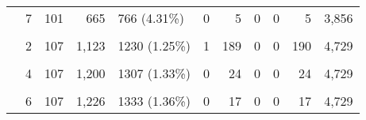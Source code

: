 \documentclass[]{bmcart}
\begin{document}
\begin{backmatter}
\begin{table}[H]
{\begin{tabular}[t]{llrrlrrrrrr}
 & 7 & 101 & 665 & 766 (4.31\%) & 0 & 5 & 0 & 0 & 5 & 3,856\\
\cellcolor{gray!6}{Session2 (n = 98371)} & \cellcolor{gray!6}{1} & \cellcolor{gray!6}{106} & \cellcolor{gray!6}{934} & \cellcolor{gray!6}{1040 (1.06\%)} & \cellcolor{gray!6}{5} & \cellcolor{gray!6}{270} & \cellcolor{gray!6}{998} & \cellcolor{gray!6}{0} & \cellcolor{gray!6}{1,273} & \cellcolor{gray!6}{4,729}\\
 & 2 & 107 & 1,123 & 1230 (1.25\%) & 1 & 189 & 0 & 0 & 190 & 4,729\\
\addlinespace
\cellcolor{gray!6}{} & \cellcolor{gray!6}{3} & \cellcolor{gray!6}{107} & \cellcolor{gray!6}{1,176} & \cellcolor{gray!6}{1283 (1.3\%)} & \cellcolor{gray!6}{0} & \cellcolor{gray!6}{53} & \cellcolor{gray!6}{0} & \cellcolor{gray!6}{0} & \cellcolor{gray!6}{53} & \cellcolor{gray!6}{4,733}\\
 & 4 & 107 & 1,200 & 1307 (1.33\%) & 0 & 24 & 0 & 0 & 24 & 4,729\\
\cellcolor{gray!6}{} & \cellcolor{gray!6}{5} & \cellcolor{gray!6}{107} & \cellcolor{gray!6}{1,209} & \cellcolor{gray!6}{1316 (1.34\%)} & \cellcolor{gray!6}{0} & \cellcolor{gray!6}{9} & \cellcolor{gray!6}{0} & \cellcolor{gray!6}{0} & \cellcolor{gray!6}{9} & \cellcolor{gray!6}{4,729}\\
 & 6 & 107 & 1,226 & 1333 (1.36\%) & 0 & 17 & 0 & 0 & 17 & 4,729\\
\bottomrule
\end{tabular}}
\end{table}


\end{backmatter}
\end{document}
